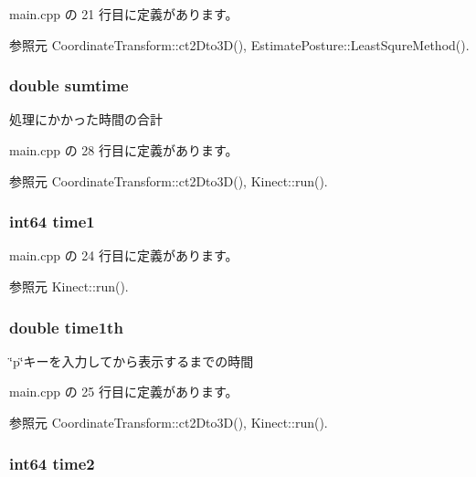  main.\-cpp の 21 行目に定義があります。



参照元 Coordinate\-Transform\-::ct2\-Dto3\-D(), Estimate\-Posture\-::\-Least\-Squre\-Method().

\subsubsection[{sumtime}]{\setlength{\rightskip}{0pt plus 5cm}double sumtime}\label{main_8cpp_a93d6409f5890605dbee315b522395064}


処理にかかった時間の合計 



 main.\-cpp の 28 行目に定義があります。



参照元 Coordinate\-Transform\-::ct2\-Dto3\-D(), Kinect\-::run().

\subsubsection[{time1}]{\setlength{\rightskip}{0pt plus 5cm}int64 time1}\label{main_8cpp_ae3b1b3b3559ae28919ff50cb10b4b19d}


 main.\-cpp の 24 行目に定義があります。



参照元 Kinect\-::run().

\subsubsection[{time1th}]{\setlength{\rightskip}{0pt plus 5cm}double time1th}\label{main_8cpp_ad7d664c3b63ac80cd47ebac01f9710b6}


\char`\"{}p\char`\"{}キーを入力してから表示するまでの時間 



 main.\-cpp の 25 行目に定義があります。



参照元 Coordinate\-Transform\-::ct2\-Dto3\-D(), Kinect\-::run().

\subsubsection[{time2}]{\setlength{\rightskip}{0pt plus 5cm}int64 time2}\label{main_8cpp_ac72f11471de429ffb48a21ee867e9c86}


